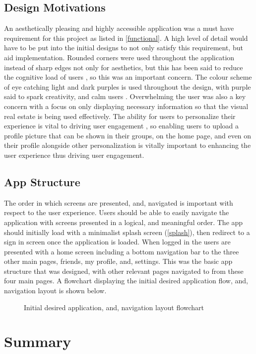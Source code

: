 \subsection*{Design Motivations}
An aesthetically pleasing and highly accessible application was a must have requirement for this project as listed in \ref{functional}. A high level of detail would have to be put into the initial designs to not only satisfy this requirement, but aid implementation. Rounded corners were used throughout the application instead of sharp edges not only for aesthetics, but this has been said to reduce the cognitive load of users \cite{roundedCorners}, so this was an important concern. The colour scheme of eye catching light and dark purples is used throughout the design, with purple said to spark creativity, and calm users \cite{purplePsych}. Overwhelming the user was also a key concern with a focus on only displaying necessary information so that the visual real estate is being used effectively. The ability for users to personalize their experience is vital to driving user engagement \cite{customUserEng}, so enabling users to upload a profile picture that can be shown in their groups, on the home page, and even on their profile alongside other personalization is vitally important to enhancing the user experience thus driving user engagement. 

\subsection*{App Structure}
The order in which screens are presented, and, navigated is important with respect to the user experience. Users should be able to easily navigate the application with screens presented in a logical, and meaningful order. The app should initially load with a minimalist splash screen (\ref{splash}), then redirect to a sign in screen once the application is loaded. When logged in the users are presented with a home screen including a bottom navigation bar to the three other main pages, friends, my profile, and, settings. This was the basic app structure that was designed, with other relevant pages navigated to from these four main pages. A flowchart displaying the initial desired application flow, and, navigation layout is shown below. 

\begin{figure}[!htbp]
    \centering
    \begin{subfigure}[b]{0.6\textwidth}
    \end{subfigure}
    \caption{Initial desired application, and, navigation layout flowchart} 
    \label{fig:layoutFlow}
\end{figure}
\FloatBarrier

\section{Summary}